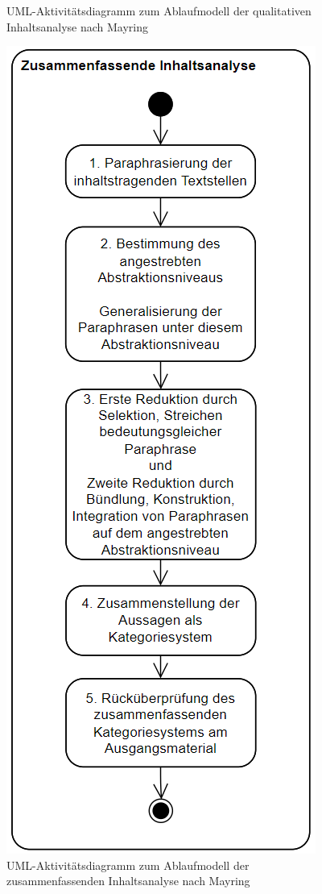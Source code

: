 \begin{figure}[H]
\begin{minipage}[b]{.4\linewidth}
		\caption{UML-Aktivitätsdiagramm zum Ablaufmodell der qualitativen Inhaltsanalyse nach Mayring \cite{mayring2019qualitative}}
		\label{fig:ablaufmodell}
	\end{minipage}
	\hspace{.1\linewidth}%
	\begin{minipage}[b]{.4\linewidth} %
		\includegraphics[scale=1.2]{Abbildungen/zusammenfassendeInhaltsanalyse.png}
		\caption{UML-Aktivitätsdiagramm zum Ablaufmodell der zusammenfassenden Inhaltsanalyse nach Mayring \cite{mayring2019qualitative}}
		\label{fig:zusammenfassendeinhaltsanalyse}
	\end{minipage}
\end{figure}
